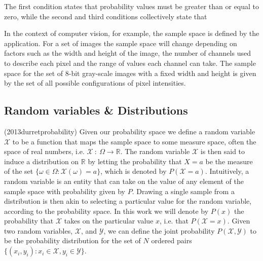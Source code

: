The first condition states that probability values must be greater than or equal to zero, while the second and third conditions collectively state that 

In the context of computer vision, for example, the sample space is defined by the application. For a set of images the sample space will change depending on factors such as the width and height of the image, the number of channels used to describe each pixel and the range of values each channel can take. The sample space for the set of 8-bit gray-scale images with a fixed width and height is given by the set of all possible configurations of pixel intensities. 

\subsection{Random variables \& Distributions}

(2013durretprobability)
Given our probability space we define a random variable $\mathcal{X}$ to be a function that maps the sample space to some measure space, often the space of real numbers, i.e. $\mathcal{X}\: : \: \Omega \rightarrow \mathbb{R}$. The random variable $\mathcal{X}$ is then said to induce a distribution on $\mathbb{R}$ by letting the probability that $X = a$ be the measure of the set $\{\omega \in \Omega : \mathcal{X}(\omega) = a\}$, which is denoted by $P(\mathcal{X} = a)$. Intuitively, a random variable is an entity that can take on the value of any element of the sample space with probability given by $P$. Drawing a single sample from a distribution is then akin to selecting a particular value for the random variable, according to the probability space. In this work we will denote by $P(x)$ the probability that $\mathcal{X}$ takes on the particular value $x$, i.e. that $P(\mathcal{X} = x)$. Given two random variables, $\mathcal{X}$, and $\mathcal{Y}$, we can define the joint probability $P(\mathcal{X},\mathcal{Y})$ to be the probability distribution for the set of $N$ ordered pairs $\{(x_i,y_i) : x_i \in \mathcal{X}, y_i \in \mathcal{Y}\}$.

